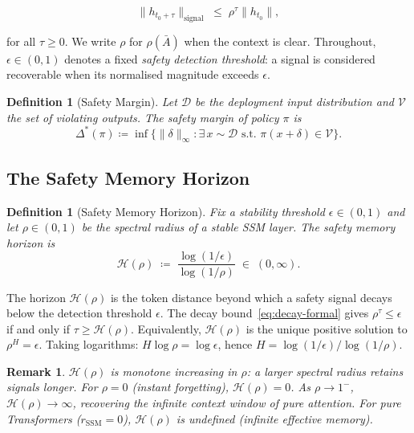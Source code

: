 \documentclass{article}
\newtheorem{definition}[theorem]{Definition}
\newtheorem{remark}[theorem]{Remark}
\newcommand{\rSSM}{r_{\mathrm{SSM}}}
\newcommand{\deltaStar}{\Delta^{*}}
\newcommand{\Horizon}{\mathcal{H}(\rho)}
\begin{document}
\begin{equation}
    \|h_{t_0 + \tau}\|_{\text{signal}} \;\leq\; \rho^{\tau} \|h_{t_0}\|,
    \label{eq:decay-formal}
\end{equation}

\noindent for all $\tau \geq 0$. We write $\rho$ for $\rho(\bar{A})$ when the context is clear. Throughout, $\epsilon \in (0,1)$ denotes a fixed \emph{safety detection threshold}: a signal is considered recoverable when its normalised magnitude exceeds $\epsilon$.

\begin{definition}[Safety Margin]
\label{def:margin}
Let $\mathcal{D}$ be the deployment input distribution and $\mathcal{V}$ the set of violating outputs. The \emph{safety margin} of policy $\pi$ is
\begin{equation}
    \deltaStar(\pi) \coloneqq \inf\bigl\{\|\delta\|_{\infty} : \exists\, x \sim \mathcal{D} \text{ s.t.\ } \pi(x + \delta) \in \mathcal{V}\bigr\}.
\end{equation}
\end{definition}

\subsection{The Safety Memory Horizon}
\label{sec:horizon-theory}

\begin{definition}[Safety Memory Horizon]
\label{def:horizon}
Fix a stability threshold $\epsilon \in (0,1)$ and let $\rho \in (0,1)$ be the spectral radius of a stable SSM layer. The \emph{safety memory horizon} is
\begin{equation}
    \Horizon \;\coloneqq\; \frac{\log(1/\epsilon)}{\log(1/\rho)} \;\in\; (0, \infty).
    \label{eq:horizon-formal}
\end{equation}
\end{definition}

The horizon $\Horizon$ is the token distance beyond which a safety signal decays below the detection threshold $\epsilon$. The decay bound~\eqref{eq:decay-formal} gives $\rho^{\tau} \leq \epsilon$ if and only if $\tau \geq \Horizon$. Equivalently, $\Horizon$ is the unique positive solution to $\rho^{H} = \epsilon$. Taking logarithms: $H \log \rho = \log \epsilon$, hence $H = \log(1/\epsilon) / \log(1/\rho)$.

\begin{remark}
$\Horizon$ is monotone increasing in $\rho$: a larger spectral radius retains signals longer. For $\rho = 0$ (instant forgetting), $\Horizon = 0$. As $\rho \to 1^-$, $\Horizon \to \infty$, recovering the infinite context window of pure attention. For pure Transformers ($\rSSM = 0$), $\Horizon$ is undefined (infinite effective memory).
\end{remark}
\end{document}
